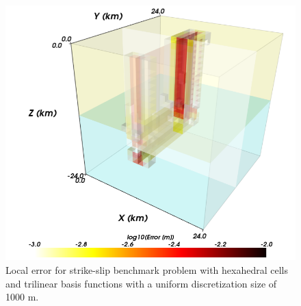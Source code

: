 \noindent \begin{center}
\begin{figure}[H]
\begin{centering}
\includegraphics[scale=0.33]{benchmarks/strikeslip/figs/error_hex8_1000m}
\par\end{centering}

\caption{Local error for strike-slip benchmark problem with hexahedral cells
and trilinear basis functions with a uniform discretization size of
1000 m.\label{fig:benchmark:strikeslip:hex8:1000m}}
\end{figure}

\par\end{center}

